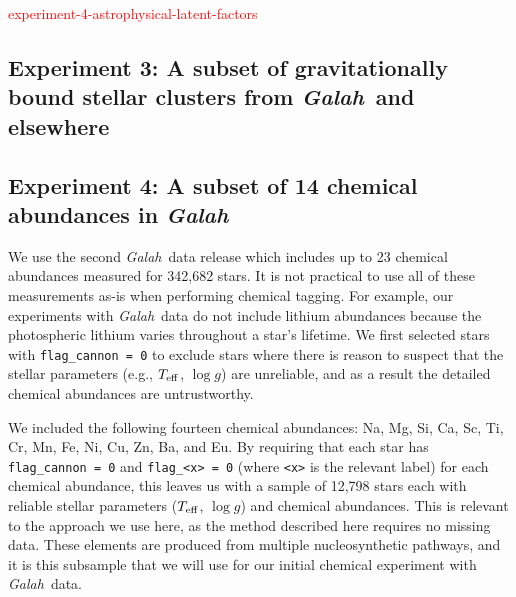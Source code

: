 \documentclass[twocolumn]{aastex61}
\newcommand\teff{T_{\rm eff}}
\newcommand\logg{\log{g}}
\newcommand{\project}[1]{\textsl{#1}}
\newcommand{\Galah}{\project{Galah}}
\newcommand{\todo}[1]{\textcolor{red}{#1}}
\begin{document}
\todo{experiment-4-astrophysical-latent-factors}


\subsection{Experiment 3: A subset of gravitationally bound stellar clusters from \Galah\ and elsewhere}
\label{sec:experiment-galah-clusters}



\subsection{Experiment 4: A subset of 14 chemical abundances in \Galah}
\label{sec:experiment-galah}


We use the second \Galah\ data release \citep{Buder:2018a} which
includes up to 23 chemical abundances measured for 342,682
stars. It is not practical to use all of these measurements as-is
when performing chemical tagging. For example, our experiments
with \Galah\ data do not include lithium abundances because the
photospheric lithium varies throughout a star's lifetime. 
We first selected stars with \texttt{flag\_cannon = 0} to exclude
stars where there is reason to suspect that the stellar parameters
(e.g., $\teff$, $\logg$) are unreliable, and as a result the 
detailed chemical abundances are untrustworthy. 

We included the following fourteen chemical abundances: Na, Mg, 
Si, Ca, Sc, Ti, Cr, Mn, Fe, Ni, Cu, Zn, Ba, and Eu.
By requiring that each star has \texttt{flag\_cannon = 0} and
\texttt{flag\_<x> = 0} (where \texttt{<x>} is the relevant label)
for each chemical abundance, this leaves
us with a sample of 12,798 stars each with reliable stellar
parameters ($\teff$, $\logg$) and chemical abundances.
This is relevant to the approach we use here, as the method
described here requires no missing data.
These elements are produced from multiple nucleosynthetic
pathways, and it is this subsample that we will use for 
our initial chemical experiment with \Galah\ data.

\end{document}
